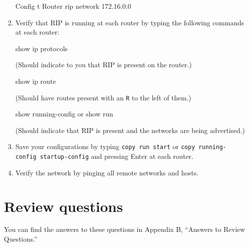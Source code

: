 \begin{enumerate}
\begin{cli}
Config t
Router rip
network 172.16.0.0
\end{cli}
\item
  \protect\hypertarget{c09.xhtmlux5cux23Page_404}{}{}Verify that RIP is
  running at each router by typing the following commands at each
  router:

\begin{cli}
show ip protocols
\end{cli}

  (Should indicate to you that RIP is present on the router.)

\begin{cli}
show ip route
\end{cli}

  (Should have routes present with an \texttt{R} to the left of them.)

\begin{cli}
show running-config or show run
\end{cli}

  (Should indicate that RIP is present and the networks are being
  advertised.)
\item
  Save your configurations by typing \texttt{copy\ run\ start} or
  \texttt{copy\ running-config\ startup-config} and pressing Enter at
  each router.
\item
  Verify the network by pinging all remote networks and hosts.
\end{enumerate}




\section{Review questions}

You can find the answers to these questions in Appendix B, ``Answers to Review Questions.''

